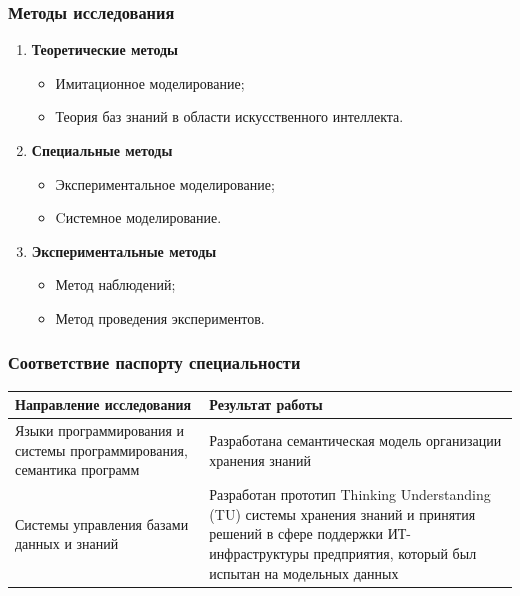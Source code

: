 \documentclass[14pt]{beamer}
\begin{document}
\begin{frame}
\frametitle{Методы исследования}
\begin{enumerate}
  \item \textbf{Теоретические методы}
  \begin{itemize}
    \item Имитационное моделирование;
    \item Теория баз знаний в области искусственного интеллекта.
  \end{itemize}
   \item \textbf{Специальные методы}
  \begin{itemize}
    \item Экспериментальное моделирование;
    \item Cистемное моделирование.
  \end{itemize}
  
   \item \textbf{Экспериментальные методы}
  \begin{itemize}
    \item Метод наблюдений;
    \item Метод проведения экспериментов.
  \end{itemize}

\end{enumerate}
\end{frame}



\begin{frame}
\frametitle{Соответствие паспорту специальности}

\begin{table}
	
\small

\begin{tabular} {|p{5cm}|p{5cm}|}


 \hline
\textbf{Направление исследования} & Результат работы\\

\hline
   Языки программирования и системы программирования, семантика программ & Разработана семантическая модель организации хранения знаний \\
   \hline
  Системы управления базами данных и знаний & Разработан прототип Thinking Understanding (TU) системы хранения знаний и принятия решений в сфере поддержки ИТ-инфраструктуры предприятия, который был испытан на модельных данных\\
   \hline
    \end{tabular}
\end{table}
\end{frame}
\end{document}
